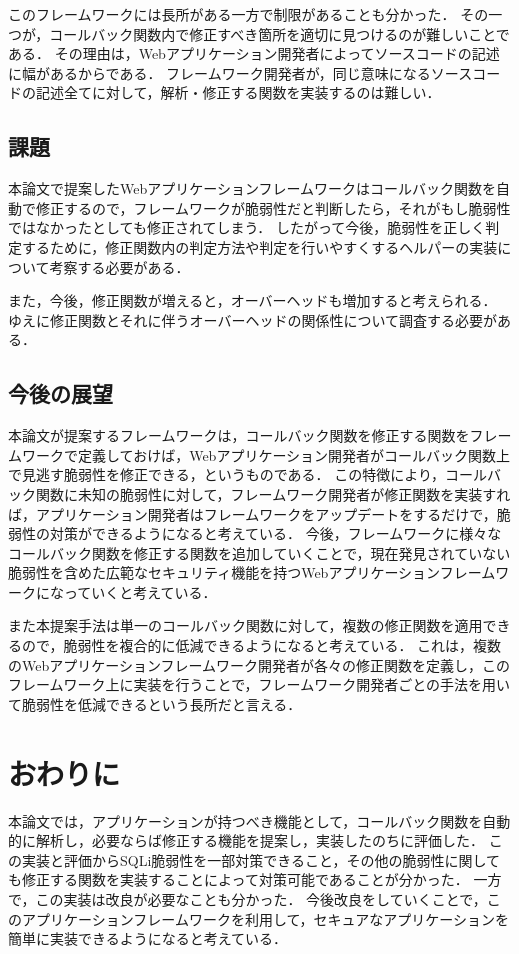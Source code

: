 \documentclass[submit]{ipsj}
\begin{document}
このフレームワークには長所がある一方で制限があることも分かった．
その一つが，コールバック関数内で修正すべき箇所を適切に見つけるのが難しいことである．
その理由は，Webアプリケーション開発者によってソースコードの記述に幅があるからである．
フレームワーク開発者が，同じ意味になるソースコードの記述全てに対して，解析・修正する関数を実装するのは難しい．

\subsection{課題}
本論文で提案したWebアプリケーションフレームワークはコールバック関数を自動で修正するので，フレームワークが脆弱性だと判断したら，それがもし脆弱性ではなかったとしても修正されてしまう．
したがって今後，脆弱性を正しく判定するために，修正関数内の判定方法や判定を行いやすくするヘルパーの実装について考察する必要がある．

また，今後，修正関数が増えると，オーバーヘッドも増加すると考えられる．
ゆえに修正関数とそれに伴うオーバーヘッドの関係性について調査する必要がある．

\subsection{今後の展望}
本論文が提案するフレームワークは，コールバック関数を修正する関数をフレームワークで定義しておけば，Webアプリケーション開発者がコールバック関数上で見逃す脆弱性を修正できる，というものである．
この特徴により，コールバック関数に未知の脆弱性に対して，フレームワーク開発者が修正関数を実装すれば，アプリケーション開発者はフレームワークをアップデートをするだけで，脆弱性の対策ができるようになると考えている．
今後，フレームワークに様々なコールバック関数を修正する関数を追加していくことで，現在発見されていない脆弱性を含めた広範なセキュリティ機能を持つWebアプリケーションフレームワークになっていくと考えている．

また本提案手法は単一のコールバック関数に対して，複数の修正関数を適用できるので，脆弱性を複合的に低減できるようになると考えている．
これは，複数のWebアプリケーションフレームワーク開発者が各々の修正関数を定義し，このフレームワーク上に実装を行うことで，フレームワーク開発者ごとの手法を用いて脆弱性を低減できるという長所だと言える．


\section{おわりに}
本論文では，アプリケーションが持つべき機能として，コールバック関数を自動的に解析し，必要ならば修正する機能を提案し，実装したのちに評価した．
この実装と評価からSQLi脆弱性を一部対策できること，その他の脆弱性に関しても修正する関数を実装することによって対策可能であることが分かった．
一方で，この実装は改良が必要なことも分かった．
今後改良をしていくことで，このアプリケーションフレームワークを利用して，セキュアなアプリケーションを簡単に実装できるようになると考えている．
\end{document}
